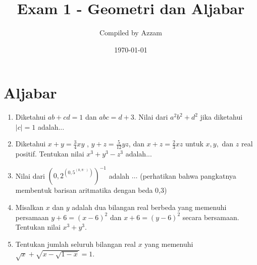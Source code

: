 \documentclass[12pt]{scrartcl}
\title{Exam 1 - Geometri dan Aljabar} %
\date{\today}
\author{Compiled by Azzam}
\begin{document}
\maketitle

\renewcommand*\contentsname{Daftar Isi}
\tableofcontents

\newpage
\section{Aljabar}
\begin{enumerate}
      \item
		Diketahui $ab+cd=1$ dan $abc=d+3$. Nilai dari $a^2b^2+d^2$ jika diketahui $|c|=1$ adalah...


	\item
		Diketahui $x+y=\frac34 xy$ , $y+z=\frac{5}{12}yz$, dan $x+z=\frac23xz$ untuk $x,y,$ dan $z$ real positif. Tentukan nilai $x^3+y^3-z^3$ adalah...


		\item Nilai dari $\left(0,2 ^{\left(0,5 ^{\left(0,8 ^{...} \right)} \right)} \right)^{-1}$ adalah $\dots$ (perhatikan bahwa pangkatnya membentuk barisan aritmatika dengan beda 0,3)

    \item
		Misalkan $x$ dan $y$ adalah dua bilangan real berbeda yang memenuhi persamaan $y+6 = (x-6)^2$ dan $x+6 = (y-6)^2$ secara bersamaan. Tentukan nilai $x^3+y^3$.

		\item Tentukan jumlah seluruh bilangan real $x$ yang memenuhi $\sqrt{x}+\sqrt{x-\sqrt{1-x}}=1$.
\end{enumerate}

\
\end{document}
